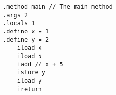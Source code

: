 \documentclass{article}
\begin{document}
  \begin{verbatim}
.method main // The main method
.args 2
.locals 1
.define x = 1
.define y = 2
    iload x
    iload 5
    iadd // x + 5
    istore y
    iload y
    ireturn
  \end{verbatim}
\end{document}

